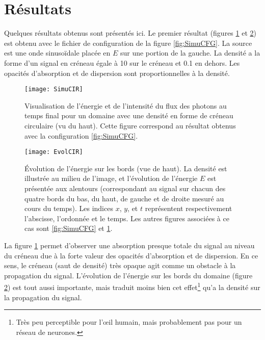 
\section{Résultats}

Quelques résultats obtenus sont présentés ici. Le premier résultat (figures \ref{fig:SimuCIR} et \ref{fig:EvolCIR}) est obtenu avec le fichier de configuration de la figure \ref{fig:SimuCFG}. La source est une onde sinusoïdale placée en $E$ sur une portion de la gauche. La densité a la forme d'un signal en créneau égale à 10 sur le créneau et 0.1 en dehors. Les opacités d'absorption et de dispersion sont proportionnelles à la densité.

\begin{figure}[H]
\centering
\texttt{[image: SimuCIR]} 
\decoRule
\caption[SimuCIR]{Visualisation de l'énergie et de l'intensité du flux des photons au temps final pour un domaine avec une densité en forme de créneau circulaire (vu du haut). Cette figure correspond au résultat obtenus avec la configuration \ref{fig:SimuCFG}.}
\label{fig:SimuCIR}
\end{figure}

\begin{figure}[H]
\centering
\texttt{[image: EvolCIR]} 
\decoRule
\caption[EvolCIR]{Évolution de l'énergie sur les bords (vue de haut). La densité est illustrée au milieu de l'image, et l'évolution de l'énergie $E$ est présentée aux alentours (correspondant au signal sur chacun des quatre bords du bas, du haut, de gauche et de droite mesuré au cours du temps). Les indices $x$, $y$, et $t$ représentent respectivement l'abscisse, l'ordonnée et le temps. Les autres figures associées à ce cas sont \ref{fig:SimuCFG} et \ref{fig:SimuCIR}.}
\label{fig:EvolCIR}
\end{figure}

La figure \ref{fig:SimuCIR} permet d'observer une absorption presque totale du signal au niveau du créneau due à la forte valeur des opacités d'absorption et de dispersion. En ce sens, le créneau (saut de densité) très opaque agit comme un obstacle à la propagation du signal. L'évolution de l'énergie sur les bords du domaine (figure \ref{fig:EvolCIR}) est tout aussi importante, mais traduit moins bien cet effet\footnote{Très peu perceptible pour l'œil humain, mais probablement pas pour un réseau de neurones.} qu'a la densité sur la propagation du signal.

